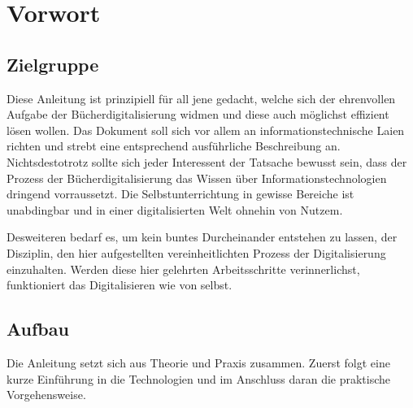 
\section{Vorwort}

\subsection{Zielgruppe}

Diese Anleitung ist prinzipiell für all jene gedacht, welche sich
der ehrenvollen Aufgabe der Bücherdigitalisierung widmen und diese
auch möglichst effizient lösen wollen. Das Dokument soll sich vor
allem an informationstechnische Laien richten und strebt eine entsprechend
ausführliche Beschreibung an. Nichtsdestotrotz sollte sich jeder Interessent
der Tatsache bewusst sein, dass der Prozess der Bücherdigitalisierung
das Wissen über Informationstechnologien dringend vorraussetzt. Die
Selbstunterrichtung in gewisse Bereiche ist unabdingbar und in einer
digitalisierten Welt ohnehin von Nutzem.

Desweiteren bedarf es, um kein buntes Durcheinander entstehen zu lassen,
der Disziplin, den hier aufgestellten vereinheitlichten Prozess der
Digitalisierung einzuhalten. Werden diese hier gelehrten Arbeitsschritte
verinnerlichst, funktioniert das Digitalisieren wie von selbst.

\subsection{Aufbau}

Die Anleitung setzt sich aus Theorie und Praxis zusammen. Zuerst folgt
eine kurze Einführung in die Technologien und im Anschluss daran die
praktische Vorgehensweise. 
